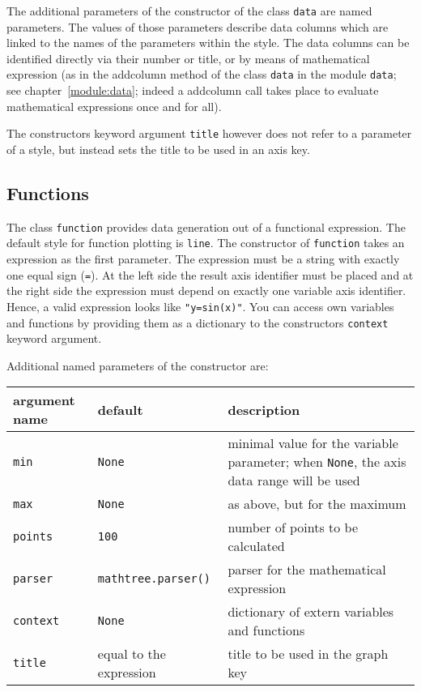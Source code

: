 The additional parameters of the constructor of the class \verb|data|
are named parameters. The values of those parameters describe data
columns which are linked to the names of the parameters within the
style. The data columns can be identified directly via their number or
title, or by means of mathematical expression (as in the addcolumn
method of the class \verb|data| in the module \verb|data|; see
chapter~\ref{module:data}; indeed a addcolumn call takes place to
evaluate mathematical expressions once and for all).

The constructors keyword argument \verb|title| however does not
refer to a parameter of a style, but instead sets the title to be used
in an axis key.

\subsection{Functions}

The class \verb|function| provides data generation out of a functional
expression. The default style for function plotting is \verb|line|.
The constructor of \verb|function| takes an expression as the first
parameter. The expression must be a string with exactly one equal sign
(\verb|=|). At the left side the result axis identifier must be placed
and at the right side the expression must depend on exactly one
variable axis identifier. Hence, a valid expression looks like
\verb|"y=sin(x)"|. You can access own variables and functions by
providing them as a dictionary to the constructors \verb|context|
keyword argument.

Additional named parameters of the constructor are:

\medskip
\begin{tabularx}{\linewidth}{ll>{\raggedright\arraybackslash}X}
argument name&default&description\\
\hline
\texttt{min}&\texttt{None}&minimal value for the variable parameter; when \texttt{None}, the axis data range will be used\\
\texttt{max}&\texttt{None}&as above, but for the maximum\\
\texttt{points}&\texttt{100}&number of points to be calculated\\
\texttt{parser}&\texttt{mathtree.parser()}&parser for the mathematical expression\\
\texttt{context}&\texttt{None}&dictionary of extern variables and functions\\
\texttt{title}&equal to the expression&title to be used in the graph key\\
\end{tabularx}
\medskip

